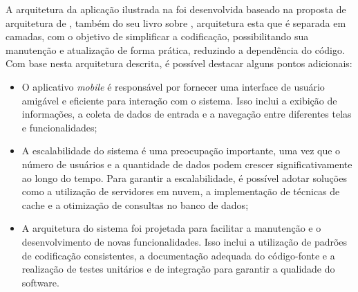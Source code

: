A arquitetura da aplicação ilustrada na  foi desenvolvida baseado na proposta de arquitetura de \cite{martin2018arquitetura}, também do seu livro sobre , arquitetura esta que é separada em camadas, com o objetivo de simplificar a codificação, possibilitando sua manutenção e atualização de forma prática, reduzindo a dependência do código. Com base nesta arquitetura descrita, é possível destacar alguns pontos adicionais:

\begin{itemize}
   \item O aplicativo \textit{mobile} é responsável por fornecer uma interface de usuário amigável e eficiente para interação com o sistema. Isso inclui a exibição de informações, a coleta de dados de entrada e a navegação entre diferentes telas e funcionalidades;
   \item A escalabilidade do sistema é uma preocupação importante, uma vez que o número de usuários e a quantidade de dados podem crescer significativamente ao longo do tempo. Para garantir a escalabilidade, é possível adotar soluções como a utilização de servidores em nuvem, a implementação de técnicas de cache e a otimização de consultas no banco de dados;
   \item A arquitetura do sistema foi projetada para facilitar a manutenção e o desenvolvimento de novas funcionalidades. Isso inclui a utilização de padrões de codificação consistentes, a documentação adequada do código-fonte e a realização de testes unitários e de integração para garantir a qualidade do software.
 \end{itemize}

